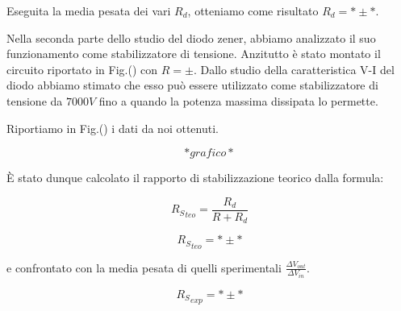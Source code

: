 Eseguita la media pesata dei vari $R_d$, otteniamo come risultato $R_d= * \pm *$.


Nella seconda parte dello studio del diodo zener, abbiamo analizzato il suo funzionamento come stabilizzatore di tensione. Anzitutto è stato montato il circuito riportato in Fig.() con $R= \pm $.  Dallo studio della caratteristica V-I del diodo abbiamo stimato che esso può essere utilizzato come stabilizzatore di tensione da $7000 V$ fino a quando la potenza massima dissipata lo permette. 

Riportiamo in Fig.() i dati da noi ottenuti.

$$*grafico*$$

\`E stato dunque calcolato il rapporto di stabilizzazione teorico dalla formula: 

\begin{equation}
{R_S}_{teo}=\frac{R_d}{R+R_d}
\label{RS_teo}
\end{equation}

$${R_S}_{teo}= * \pm *$$

e confrontato con la media pesata di quelli sperimentali $\frac{\Delta V_{out}}{\Delta V_{in}}$.

$${R_S}_{exp}= * \pm *$$
 